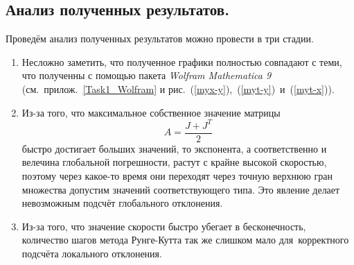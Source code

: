 \documentclass[a4paper,14pt]{article}
\begin{document}
\subsection{Анализ полученных результатов.}
Проведём анализ полученных результатов можно провести в три стадии.
\begin{enumerate}
\item Несложно заметить, что полученное графики полностью совпадают с теми, что полученны с помощью пакета {\it Wolfram Mathematica 9} (см.~прилож.~\ref{Task1_Wolfram} и рис.~(\ref{myx-y}),~(\ref{myt-y})~и~(\ref{myt-x})).
\item Из-за того, что максимальное собственное значение матрицы
\[
A = \frac{J + J^T}{2}
\]
быстро достигает больших значений, то экспонента, а соответственно и велечина глобальной погрешности, растут с крайне высокой скоростью, поэтому через какое-то время они переходят через точную верхнюю гран множества допустим значений соответствующего типа. Это явление делает невозможным подсчёт глобального отклонения. 
\item Из-за того, что значение скорости быстро убегает в бесконечность, количество шагов метода Рунге-Кутта так же слишком мало для~корректного подсчёта локального отклонения.

\begin{figure}[H]
\noindent{}
\end{figure}


\end{enumerate}
\end{document}
